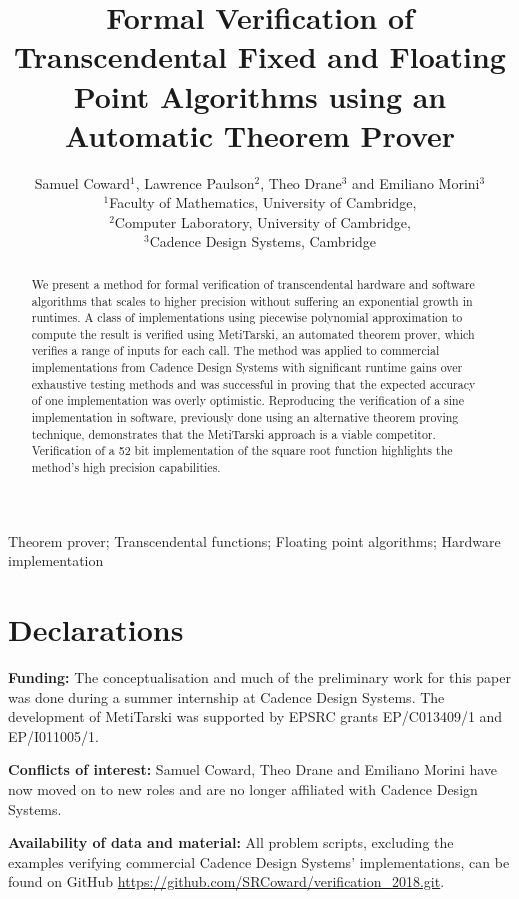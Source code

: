 \documentclass{fac}
\title[Transcendental Verification using Theorem Proving]{Formal Verification of Transcendental Fixed and Floating Point Algorithms using an Automatic Theorem Prover}
\author[Samuel Coward]
    {Samuel Coward$^1$, Lawrence Paulson$^2$, Theo Drane$^3$ and Emiliano Morini$^3$\\
     $^1$Faculty of Mathematics, University of Cambridge,\\
     $^2$Computer Laboratory, University of Cambridge,\\
     $^3$Cadence Design Systems, Cambridge\\}
\begin{document}
\label{firstpage}

\makecorrespond

\maketitle

\begin{abstract}
We present a method for formal verification of transcendental hardware and software algorithms that scales to higher precision without suffering an exponential growth in runtimes. A class of implementations using piecewise polynomial approximation to compute the result is verified using MetiTarski, an automated theorem prover, which verifies a range of inputs for each call. The method was applied to commercial implementations from Cadence Design Systems with significant runtime gains over exhaustive testing methods and was successful in proving that the expected accuracy of one implementation was overly optimistic. Reproducing the verification of a sine implementation in software, previously done using an alternative theorem proving technique, demonstrates that the MetiTarski approach is a viable competitor. Verification of a 52 bit implementation of the square root function highlights the method's high precision capabilities.  
\end{abstract}
\begin{keywords}Theorem prover; Transcendental functions; Floating point algorithms; Hardware implementation
\end{keywords}

\section*{Declarations}
\textbf{Funding:} The conceptualisation and much of the preliminary work for this paper was done during a summer internship at Cadence Design Systems.
The development of MetiTarski was supported by EPSRC grants EP/C013409/1 and EP/I011005/1.

\noindent\textbf{Conflicts of interest:} Samuel Coward, Theo Drane and Emiliano Morini have now moved on to new roles and are no longer affiliated with Cadence Design Systems. 

\noindent\textbf{Availability of data and material:} All problem scripts, excluding the examples verifying commercial Cadence Design Systems' implementations, can be found on GitHub \newline \url{https://github.com/SRCoward/verification\_2018.git}.
\end{document}
